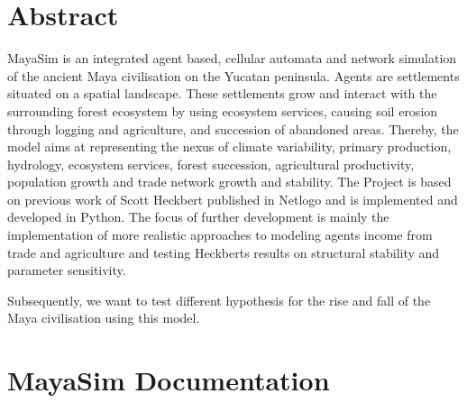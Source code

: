 \section{Abstract}
MayaSim is an integrated agent based, cellular automata and network simulation of the ancient Maya civilisation on the Yucatan peninsula. Agents are settlements situated on a spatial landscape. These settlements grow and interact with the surrounding forest ecosystem by using ecosystem services, causing soil erosion through logging and agriculture, and succession of abandoned areas. Thereby, the model aims at representing the nexus of climate variability, primary production, hydrology, ecosystem services, forest succession, agricultural productivity, population growth and trade network growth and stability. The Project is based on previous work of Scott Heckbert \cite{heckbert} published in Netlogo and is implemented and developed in Python. The focus of further development is mainly the implementation of more realistic approaches to modeling agents income from trade and agriculture and testing Heckberts results on structural stability and parameter sensitivity. \par
Subsequently, we want to test different hypothesis for the rise and fall of the Maya civilisation using this model.
\section{MayaSim Documentation}
